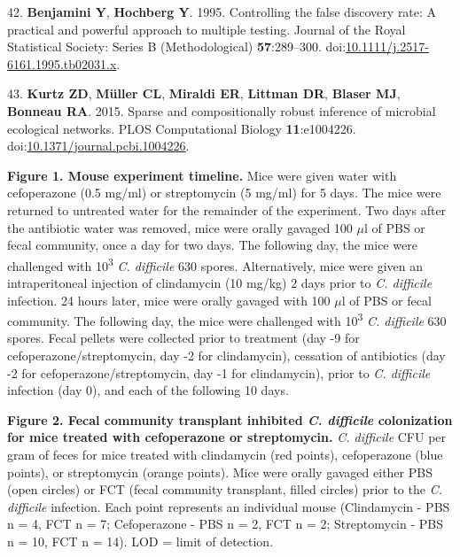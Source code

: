 \documentclass[
  12pt,
]{article}
\newenvironment{cslreferences}%
  {}%
  {\par}
\begin{document}
\begin{cslreferences}
\leavevmode\hypertarget{ref-Benjamini1995}{}%
42. \textbf{Benjamini Y}, \textbf{Hochberg Y}. 1995. Controlling the
false discovery rate: A practical and powerful approach to multiple
testing. Journal of the Royal Statistical Society: Series B
(Methodological) \textbf{57}:289--300.
doi:\href{https://doi.org/10.1111/j.2517-6161.1995.tb02031.x}{10.1111/j.2517-6161.1995.tb02031.x}.

\leavevmode\hypertarget{ref-Kurtz2015}{}%
43. \textbf{Kurtz ZD}, \textbf{Müller CL}, \textbf{Miraldi ER},
\textbf{Littman DR}, \textbf{Blaser MJ}, \textbf{Bonneau RA}. 2015.
Sparse and compositionally robust inference of microbial ecological
networks. PLOS Computational Biology \textbf{11}:e1004226.
doi:\href{https://doi.org/10.1371/journal.pcbi.1004226}{10.1371/journal.pcbi.1004226}.
\end{cslreferences}

\newpage

\textbf{Figure 1. Mouse experiment timeline.} Mice were given water with
cefoperazone (0.5 mg/ml) or streptomycin (5 mg/ml) for 5 days. The mice
were returned to untreated water for the remainder of the experiment.
Two days after the antibiotic water was removed, mice were orally
gavaged 100 \(\mu\)l of PBS or fecal community, once a day for two days.
The following day, the mice were challenged with 10\textsuperscript{3}
\emph{C. difficile} 630 spores. Alternatively, mice were given an
intraperitoneal injection of clindamycin (10 mg/kg) 2 days prior to
\emph{C. difficile} infection. 24 hours later, mice were orally gavaged
with 100 \(\mu\)l of PBS or fecal community. The following day, the mice
were challenged with 10\textsuperscript{3} \emph{C. difficile} 630
spores. Fecal pellets were collected prior to treatment (day -9 for
cefoperazone/streptomycin, day -2 for clindamycin), cessation of
antibiotics (day -2 for cefoperazone/streptomycin, day -1 for
clindamycin), prior to \emph{C. difficile} infection (day 0), and each
of the following 10 days.

\hfill\break

\textbf{Figure 2. Fecal community transplant inhibited \emph{C.
difficile} colonization for mice treated with cefoperazone or
streptomycin.} \emph{C. difficile} CFU per gram of feces for mice
treated with clindamycin (red points), cefoperazone (blue points), or
streptomycin (orange points). Mice were orally gavaged either PBS (open
circles) or FCT (fecal community transplant, filled circles) prior to
the \emph{C. difficile} infection. Each point represents an individual
mouse (Clindamycin - PBS n = 4, FCT n = 7; Cefoperazone - PBS n = 2, FCT
n = 2; Streptomycin - PBS n = 10, FCT n = 14). LOD = limit of detection.
\end{document}
